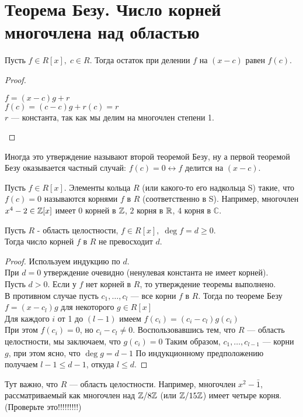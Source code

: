 
\section{Теорема Безу. Число корней многочлена над областью}
\begin{normalsize}
\begin{theorem-non}
    Пусть $f \in R[x],\; c \in R$. Тогда остаток при делении $f$ на $(x - c)$ равен $f(c)$.
\end{theorem-non}

\begin{proof}
    $ $ \\
    \begin{center}
        $f = (x-c)g + r$\\
        $f(c) = (c - c)g + r(c) = r$\\
        $r$ --- константа, так как мы делим на многочлен степени 1.
    \end{center}
    
\end{proof}

\notice Иногда это утверждение называют второй теоремой Безу, ну а первой теоремой Безу оказывается частный случай: $f(c) = 0 \leftrightarrow f$ делится на $(x-c)$.

Пусть $f \in R[x]$. Элементы кольца $R$ (или какого-то его надкольца S) такие, что $f(c) = 0$ называются корнями $f$ в $R$ (соответственно в S).
Например, многочлен $x^4 - 2 \in \mathbb{Z}[x]$ имеет $0$ корней в $\mathbb{Z}$, $2$ корня в $\mathbb{R}$, $4$ корня в $\mathbb{C}$.

\begin{theorem-non}
    Пусть $R$ - область целостности, $f \in R[x],\; \deg f = d \geqslant 0$. \\
    Тогда число корней $f$ в $R$ не превосходит $d$.
\end{theorem-non}

\begin{proof}
    Используем индукцию по $d$. \\
    При $d = 0$ утверждение очевидно (ненулевая константа не имеет корней). \\
    Пусть $d > 0$. Если у $f$ нет корней в $R$, то утверждение теоремы выполнено. \\
    В противном случае пусть $c_1, \dots, c_l$ --- все корни $f$ в $R$. Тогда по теореме Безу
    $f = (x - c_l)g$ для некоторого $g \in R[x]$ \\
    Для каждого $i$ от 1 до $(l-1)$ имеем $f(c_i) = (c_i - c_l)g(c_i)$\\
    При этом $f(c_i) = 0$, но $c_i - c_l \neq 0$. Воспользовавшись тем, что $R$ --- область целостности, мы заключаем, что $g(c_i) = 0$
    Таким образом, $c_1,\dots,c_{l-1}$ --- корни $g$, при этом ясно, что $\deg g = d - 1$
    По индукционному предположению получаем $l - 1 \leqslant d - 1$, откуда $l \leqslant d$.
\end{proof}

\notice
Тут важно, что $R$  --- область целостности. Например, многочлен $x^2 - \bar{1}$, рассматриваемый как многочлен над $\mathbb{Z} / 8\mathbb{Z}$ (или $\mathbb{Z} / 15\mathbb{Z}$) имеет четыре корня. (Проверьте это!!!!!!!!!)
\end{normalsize}